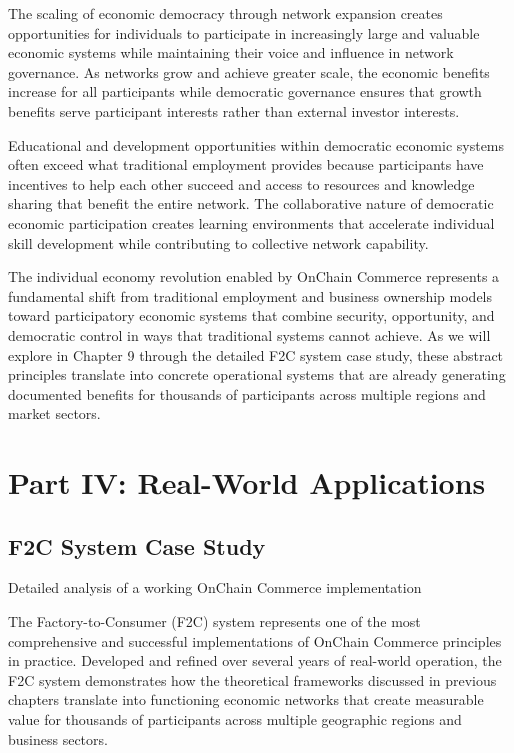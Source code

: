 \documentclass[
  Letterpaper,
]{scrbook}
\begin{document}
The scaling of economic democracy through network expansion creates
opportunities for individuals to participate in increasingly large and
valuable economic systems while maintaining their voice and influence in
network governance. As networks grow and achieve greater scale, the
economic benefits increase for all participants while democratic
governance ensures that growth benefits serve participant interests
rather than external investor interests.

Educational and development opportunities within democratic economic
systems often exceed what traditional employment provides because
participants have incentives to help each other succeed and access to
resources and knowledge sharing that benefit the entire network. The
collaborative nature of democratic economic participation creates
learning environments that accelerate individual skill development while
contributing to collective network capability.

The individual economy revolution enabled by OnChain Commerce represents
a fundamental shift from traditional employment and business ownership
models toward participatory economic systems that combine security,
opportunity, and democratic control in ways that traditional systems
cannot achieve. As we will explore in Chapter 9 through the detailed F2C
system case study, these abstract principles translate into concrete
operational systems that are already generating documented benefits for
thousands of participants across multiple regions and market sectors.

\part{Part IV: Real-World Applications}

\chapter{F2C System Case Study}\label{sec-f2c-case-study}

Detailed analysis of a working OnChain Commerce implementation

The Factory-to-Consumer (F2C) system represents one of the most
comprehensive and successful implementations of OnChain Commerce
principles in practice. Developed and refined over several years of
real-world operation, the F2C system demonstrates how the theoretical
frameworks discussed in previous chapters translate into functioning
economic networks that create measurable value for thousands of
participants across multiple geographic regions and business sectors.
\end{document}
